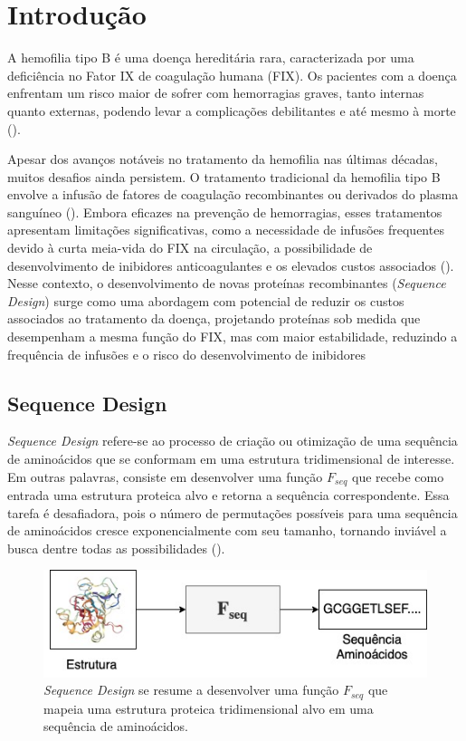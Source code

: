\chapter{Introdução}
\label{cap:introducao}
\enlargethispage{.5\baselineskip}

A hemofilia tipo B é uma doença hereditária rara, 
caracterizada por uma deficiência no Fator IX de coagulação humana (FIX). 
Os pacientes com a doença enfrentam um risco maior de sofrer com hemorragias graves, 
tanto internas quanto externas, 
podendo levar a complicações debilitantes e até mesmo à morte (\cite{Mannucci}).

Apesar dos avanços notáveis no tratamento da hemofilia nas últimas décadas,
muitos desafios ainda persistem.
O tratamento tradicional da hemofilia tipo B envolve a infusão de fatores de coagulação recombinantes
ou derivados do plasma sanguíneo (\cite{Gouw}). 
Embora eficazes na prevenção de hemorragias,
esses tratamentos apresentam limitações significativas,
como a necessidade de infusões frequentes devido à curta meia-vida do FIX na circulação,
a possibilidade de desenvolvimento de inibidores anticoagulantes e os elevados custos associados (\cite{Mancuso}).
Nesse contexto, o desenvolvimento de novas proteínas recombinantes (\textit{Sequence Design}) surge 
como uma abordagem com potencial de reduzir os custos associados ao tratamento da doença, 
projetando proteínas sob medida que desempenham a mesma função do FIX, mas com maior estabilidade,
reduzindo a frequência de infusões e o risco do desenvolvimento de inibidores

\section{Sequence Design}

\textit{Sequence Design} refere-se ao processo de criação ou
otimização de uma sequência de aminoácidos que se conformam em uma estrutura tridimensional de interesse.
Em outras palavras, consiste em desenvolver uma função $F_{seq}$ que 
recebe como entrada uma estrutura proteica alvo e retorna a sequência correspondente. 
Essa tarefa é desafiadora, 
pois o número de permutações possíveis para uma sequência de aminoácidos
cresce exponencialmente com seu tamanho, 
tornando inviável a busca dentre todas as possibilidades (\cite{Overview}).

\begin{figure}[H]
  \caption[\textit{Sequence Design}]{\textit{Sequence Design} se resume a desenvolver uma 
  função $F_{seq}$ que mapeia uma estrutura proteica tridimensional alvo em uma sequência de aminoácidos.}
  \centering
  \includegraphics[width=.8\textwidth]{figuras/metodologia-SeqDes.jpg}
\end{figure}

